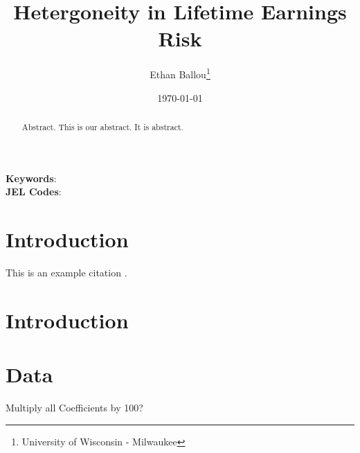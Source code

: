 \documentclass[12pt]{article}
\title{Hetergoneity in Lifetime Earnings Risk}
\author{Ethan Ballou\thanks{University of Wisconsin - Milwaukee}}
\date{\today}
\begin{document}
\maketitle
\thispagestyle{empty}



\begin{abstract}
\begin{singlespace}
\noindent 
Abstract.  This is our abstract.  It is abstract.  
\end{singlespace}
\end{abstract}
\noindent
\textbf{Keywords}: \\
\textbf{JEL Codes}: \\






\clearpage
\setcounter{page}{1}
\begin{center}
\end{center}
\section{Introduction}

This is an example citation \cite{exampleCitation}.
\section{Introduction}


\section{Data}

Multiply all Coefficients by 100?

\vspace{4cm}
\end{document}
